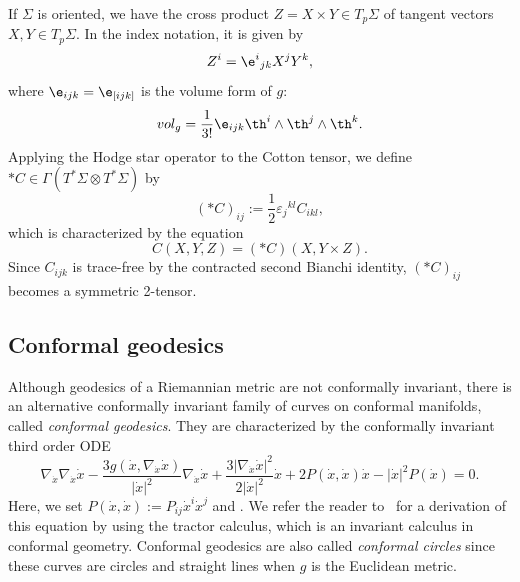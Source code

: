 If $\Sigma$ is oriented, we have the cross product $Z=X\times Y\in T_p\Sigma$ of tangent vectors $X, Y\in T_p\Sigma$. In the index notation, it is given by
\[
Z^i=\e^i{}_{jk}X^j Y^k,
\]
where $\e_{ijk}=\e_{[ijk]}$ is the volume form of $g$:
\[
vol_g=\frac{1}{3!}\e_{ijk}\th^i\wedge \th^j\wedge \th^k.
\]
Applying the Hodge star operator to the Cotton tensor, we define $*C\in\Gamma(T^*\Sigma\otimes T^*\Sigma)$ by
\[
(*C)_{ij}:=\frac{1}{2}\varepsilon_j{}^{kl}C_{ikl},
\]
which is characterized by the equation
\[
C(X, Y, Z)=(*C)(X, Y\times Z).
\]
Since $C_{ijk}$ is trace-free by the contracted second Bianchi identity, $(*C)_{ij}$ becomes a symmetric 2-tensor.

\subsection{Conformal geodesics}
Although geodesics of a Riemannian metric are not conformally invariant, there is an alternative conformally invariant family of curves on conformal manifolds, called {\it conformal geodesics}. They are characterized by the conformally invariant third order ODE
\begin{equation}\label{conf-geod-proj}
\nabla_{\dot x}\nabla_{\dot x}\dot x-\frac{3g(\dot x, \nabla_{\dot x}\dot x)}{|\dot x|^2}\nabla_{\dot x}\dot x+\frac{3|\nabla_{\dot x}\dot x|^2}{2|\dot x|^2}\dot x
+2P(\dot x, \dot x)\dot x-|\dot x|^2P(\dot x)=0.
\end{equation}
Here, we set $P(\dot x, \dot x):=P_{ij}\dot x^i\dot x^j$ and . We refer the reader to~\cite{BEG} for a derivation of this equation by using the tractor calculus, which is an invariant calculus in conformal geometry.
Conformal geodesics are also called {\it conformal circles} since these curves are circles and straight lines when $g$ is the Euclidean metric.

